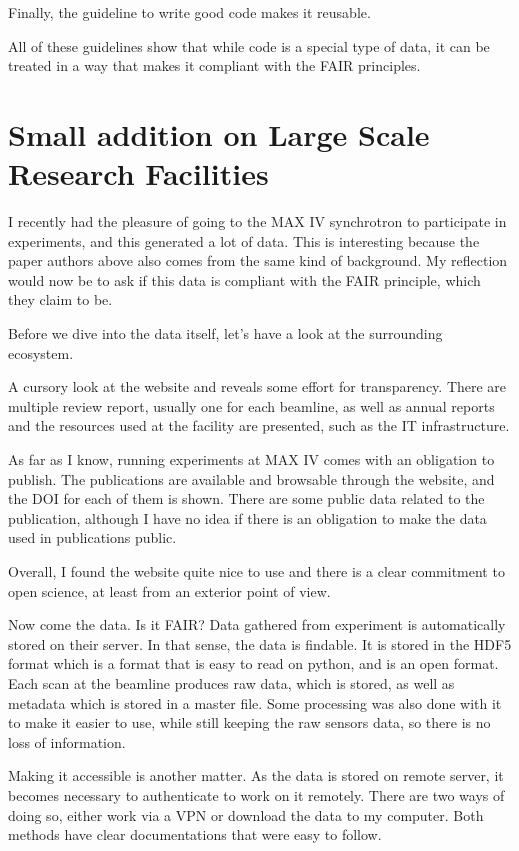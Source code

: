 \documentclass{article}
\begin{document}
Finally, the guideline to write good code makes it reusable. 

All of these guidelines show that while code is a special type of data, it can be treated in a way that makes it compliant with the FAIR principles.

\section{Small addition on Large Scale Research Facilities}

I recently had the pleasure of going to the MAX IV synchrotron to participate in experiments, and this generated a lot of data. This is interesting because the paper authors above also comes from the same kind of background. My reflection would now be to ask if this data is compliant with the FAIR principle, which they claim to be. 

Before we dive into the data itself, let's have a look at the surrounding ecosystem.

A cursory look at the website and reveals some effort for transparency. There are multiple review report, usually one for each beamline, as well as annual reports and the resources used at the facility are presented, such as the IT infrastructure. 

As far as I know, running experiments at MAX IV comes with an obligation to publish. The publications are available and browsable through the website, and the DOI for each of them is shown. There are some public data related to the publication, although I have no idea if there is an obligation to make the data used in publications public.

Overall, I found the website quite nice to use and there is a clear commitment to open science, at least from an exterior point of view.

Now come the data. Is it FAIR? Data gathered from experiment is automatically stored on their server. In that sense, the data is findable. It is stored in the HDF5 format which is a format that is easy to read on python, and is an open format. Each scan at the beamline produces raw data, which is stored, as well as metadata which is stored in a master file. Some processing was also done with it to make it easier to use, while still keeping the raw sensors data, so there is no loss of information. 

Making it accessible is another matter. As the data is stored on remote server, it becomes necessary to authenticate to work on it remotely. There are two ways of doing so, either work via a VPN or download the data to my computer. Both methods have clear documentations that were easy to follow. 
\end{document}

